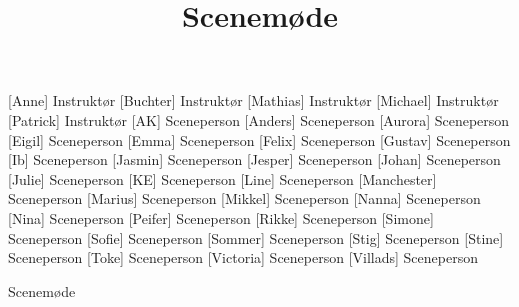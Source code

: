 \documentclass[a4paper,11pt]{article}
\title{Scenemøde}
\author{ }
\begin{document}
\maketitle

\begin{roles}
[Anne] Instruktør
[Buchter] Instruktør
[Mathias] Instruktør
[Michael] Instruktør
[Patrick] Instruktør
[AK] Sceneperson
[Anders] Sceneperson
[Aurora] Sceneperson
[Eigil] Sceneperson
[Emma] Sceneperson
[Felix] Sceneperson
[Gustav] Sceneperson
[Ib] Sceneperson
[Jasmin] Sceneperson
[Jesper] Sceneperson
[Johan] Sceneperson
[Julie] Sceneperson
[KE] Sceneperson
[Line] Sceneperson
[Manchester] Sceneperson
[Marius] Sceneperson
[Mikkel] Sceneperson
[Nanna] Sceneperson
[Nina] Sceneperson
[Peifer] Sceneperson
[Rikke] Sceneperson
[Simone] Sceneperson
[Sofie] Sceneperson
[Sommer] Sceneperson
[Stig] Sceneperson
[Stine] Sceneperson
[Toke] Sceneperson
[Victoria] Sceneperson
[Villads] Sceneperson
\end{roles}

\begin{song}
Scenemøde
\end{song}
\end{document}
